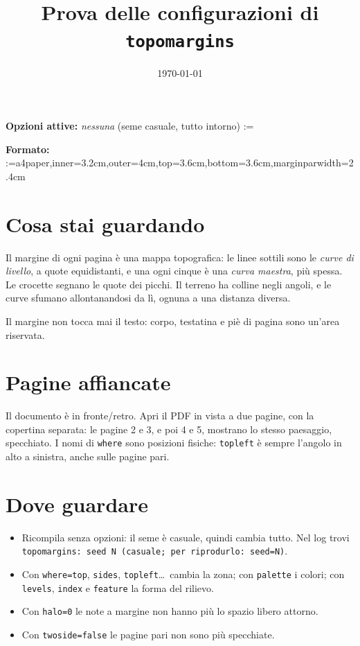 \documentclass[11pt,twoside]{article}   %
\title{Prova delle configurazioni di \texttt{topomargins}}
\author{}
\date{\today}
\makeatletter
\def\formato{a4paper,inner=3.2cm,outer=4cm,top=3.6cm,bottom=3.6cm,marginparwidth=2.4cm}
\def\opzioni{}
\newcommand{\mostra}[1]{\def\sep{}%
  \@for\voce:=#1\do{\sep\texttt{\expandafter\detokenize\expandafter{\voce}}\def\sep{,\ }}}
\def\vuoto{}
\makeatother
\begin{document}
\maketitle

{\raggedright
\noindent\textbf{Opzioni attive:}
\ifx\opzioni\vuoto\emph{nessuna} (seme casuale, tutto intorno)\else\mostra{\opzioni}\fi\par
\smallskip
\noindent\textbf{Formato:} \mostra{\formato}\par}

\section{Cosa stai guardando}

Il margine di ogni pagina è una mappa topografica: le linee sottili sono le \emph{curve
di livello}, a quote equidistanti, e una ogni cinque è una \emph{curva maestra}, più spessa.
Le crocette segnano le quote dei picchi. Il terreno ha colline negli angoli, e le curve
sfumano allontanandosi da lì, ognuna a una distanza diversa.

Il margine non tocca mai il testo: corpo, testatina e piè di pagina sono un'area
riservata.

\lipsum[1-3]

\section{Pagine affiancate}

Il documento è in fronte/retro. Apri il PDF in vista a due pagine, con la
copertina separata: le pagine 2 e 3, e poi 4 e 5, mostrano lo stesso paesaggio,
specchiato. I nomi di \texttt{where} sono posizioni fisiche: \texttt{topleft} è
sempre l'angolo in alto a sinistra, anche sulle pagine pari.

\lipsum[4-9]

\section{Dove guardare}

\begin{itemize}
  \item Ricompila senza opzioni: il seme è casuale, quindi cambia tutto. Nel log
        trovi \texttt{topomargins: seed N (casuale; per riprodurlo: seed=N)}.
  \item Con \texttt{where=top}, \texttt{sides}, \texttt{topleft}\ldots\ cambia la zona;
        con \texttt{palette} i colori; con \texttt{levels}, \texttt{index} e
        \texttt{feature} la forma del rilievo.
  \item Con \texttt{halo=0} le note a margine non hanno più lo spazio libero attorno.
  \item Con \texttt{twoside=false} le pagine pari non sono più specchiate.
\end{itemize}

\lipsum[10-16]

\lipsum[17-22]
\end{document}
